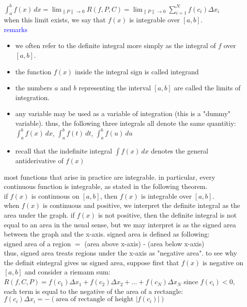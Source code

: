 \documentclass{article}
\begin{document}
$\int_{a}^{b}f(x)\, dx = \lim_{\lVert P\rVert \to 0}R(f, P, C) = \lim_{\lVert P\rVert \to 0}\sum_{i=1}^{N}f(c_i)\Delta x_i$\\

when this limit exists, we say that $f(x)$ is integrable over $[a, b]$.\\

\textcolor{blue}{remarks}
	\begin{itemize}
		\item we often refer to the definite integral more simply as the integral of $f$ over $[a, b]$.
		\item the function $f(x)$ inside the integral sign is called integrand
		\item the numbers $a$ and $b$ representing the interval $[a, b]$ are called the limits of integration.
		\item any variable may be used as a variable of integration (this is a "dummy" variable). thus, the following three integrals all denote the same quantitiy: $\int_{a}^{b}f(x)\,dx$, $\int_{a}^{b}f(t)\,dt$, $\int_{a}^{b}f(u)\,du$  
		\item recall that the indefinite integral $\int f(x)\, dx$ denotes the general antiderivative of $f(x)$
	\end{itemize}
most functions that arise in practice are integrable. in particular, every continuous function is integrable, as stated in the following theorem.\\
if $f(x)$ is continuous on $[a, b]$, then $f(x)$ is integrable over $[a, b]$.\\

when $f(x)$ is continuous and positive, we interpret the definite integral as the area under the graph. if $f(x)$ is not positive, then the definite integral is not equal to an area in the usual sense, but we may interpret is as the signed area between the graph and the x-axis. signed area is defined as following:\\
signed area of a region $=$ (area above x-axis) - (area below x-axis)\\

thus, signed area treats regions under the x-axis as "negative area". to see why the definit eintegral gives us signed area, suppose first that $f(x)$ is negative on $[a, b]$ and consider a riemann sum: $R(f, C, P) = f(c_1)\Delta x_1 + f(c_2)\Delta x_2 + \ldots + f(c_N)\Delta x_N$ since $f(c_i) < 0$, each term is equal to the negative of the area of a rectangle: $f(c_i)\Delta x_i = -(\text{area of rectangle of height }\lvert f(c_i)\rvert)$\\
\end{document}
